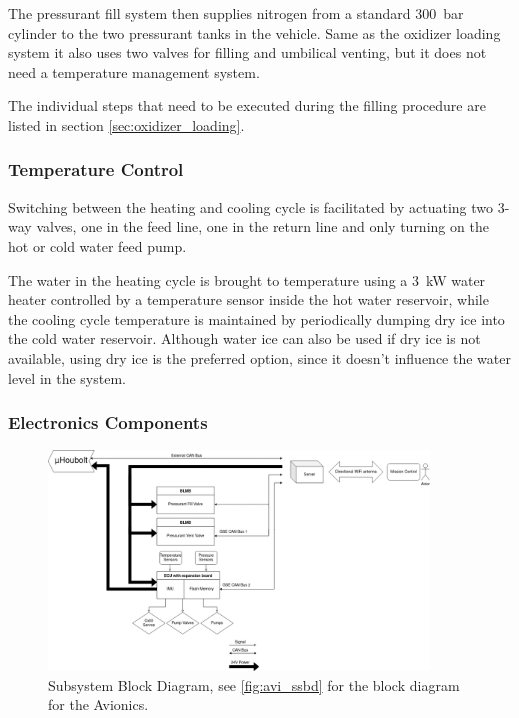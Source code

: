 The pressurant fill system then supplies nitrogen from a standard \SI{300}{\bar} cylinder to the two pressurant tanks in the vehicle. Same as the oxidizer loading system it also uses two valves for filling and umbilical venting, but it does not need a temperature management system.



The individual steps that need to be executed during the filling procedure are listed in section \ref{sec:oxidizer_loading}.

\subsubsection{Temperature Control}
Switching between the heating and cooling cycle is facilitated by actuating two 3-way valves, one in the feed line, one in the return line and only turning on the hot or cold water feed pump.

The water in the heating cycle is brought to temperature using a \SI{3}{\kilo\watt} water heater controlled by a temperature sensor inside the hot water reservoir, while the cooling cycle temperature is maintained by periodically dumping dry ice into the cold water reservoir. Although water ice can also be used if dry ice is not available, using dry ice is the preferred option, since it doesn't influence the water level in the system.

\subsubsection{Electronics Components}

\begin{figure}
    \centering
    \includegraphics[width=0.9\textwidth]{GroundSystems/GSE_Blockdiagram.png}
    \caption{Subsystem Block Diagram, see \cref{fig:avi_ssbd} for the block diagram for the Avionics.}
    \label{fig:gse_ssbd}
\end{figure}


